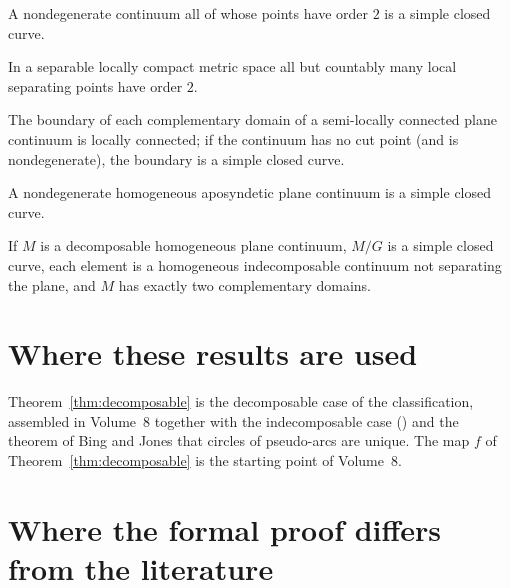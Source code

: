 \begin{theorem}
A nondegenerate continuum all of whose points have order $2$ is a simple closed curve.
\end{theorem}

\begin{theorem}
In a separable locally compact metric space all but countably many local separating points have order $2$.
\end{theorem}

\begin{theorem}
The boundary of each complementary domain of a semi-locally connected plane continuum is locally connected; if the continuum has no cut point (and is nondegenerate), the
boundary is a simple closed curve.
\end{theorem}

\begin{theorem}
A nondegenerate homogeneous aposyndetic plane continuum is a simple closed curve.
\end{theorem}

\begin{theorem}
If $M$ is a decomposable homogeneous plane continuum, $M/G$ is a simple closed curve, each element is a homogeneous indecomposable continuum not separating the plane, and $M$
has exactly two complementary domains.
\end{theorem}

\section{Where these results are used}

Theorem~\ref{thm:decomposable} is the decomposable case of the classification, assembled in Volume~8 together with the indecomposable case () and the
theorem of Bing and Jones that circles of pseudo-arcs are unique. The map $f$ of Theorem~\ref{thm:decomposable} is the starting point of Volume~8.

\section{Where the formal proof differs from the literature}\label{sec:intro-diff}


